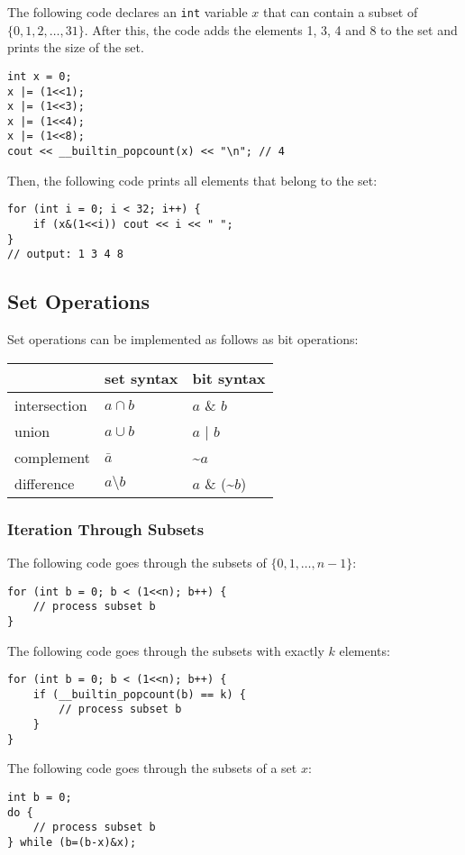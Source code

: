 \documentclass[twoside,12pt,a4paper,english]{book}
\theoremstyle{definition}
\theoremstyle{problemstyle}
\begin{document}
The following code declares an \texttt{int}
variable $x$ that can contain
a subset of $\{0,1,2,\ldots,31\}$.
After this, the code adds the elements 1, 3, 4 and 8
to the set and prints the size of the set.
\begin{lstlisting}
int x = 0;
x |= (1<<1);
x |= (1<<3);
x |= (1<<4);
x |= (1<<8);
cout << __builtin_popcount(x) << "\n"; // 4
\end{lstlisting}
Then, the following code prints all
elements that belong to the set:
\begin{lstlisting}
for (int i = 0; i < 32; i++) {
    if (x&(1<<i)) cout << i << " ";
}
// output: 1 3 4 8
\end{lstlisting}
\subsection{Set Operations}
Set operations can be implemented as follows as bit operations:

\begin{center}
\begin{tabular}{lll}
& set syntax & bit syntax \\
\hline
intersection & $a \cap b$ & $a$ \& $b$ \\
union & $a \cup b$ & $a$ | $b$ \\
complement & $\bar a$ & \textasciitilde$a$ \\
difference & $a \setminus b$ & $a$ \& (\textasciitilde$b$) \\
\end{tabular}
\end{center}
\subsubsection{Iteration Through Subsets}

The following code goes through
the subsets of $\{0,1,\ldots,n-1\}$:

\begin{lstlisting}
for (int b = 0; b < (1<<n); b++) {
    // process subset b
}
\end{lstlisting}
The following code goes through
the subsets with exactly $k$ elements:
\begin{lstlisting}
for (int b = 0; b < (1<<n); b++) {
    if (__builtin_popcount(b) == k) {
        // process subset b
    }
}
\end{lstlisting}
The following code goes through the subsets
of a set $x$:
\begin{lstlisting}
int b = 0;
do {
    // process subset b
} while (b=(b-x)&x);
\end{lstlisting}
\newpage
\end{document}
